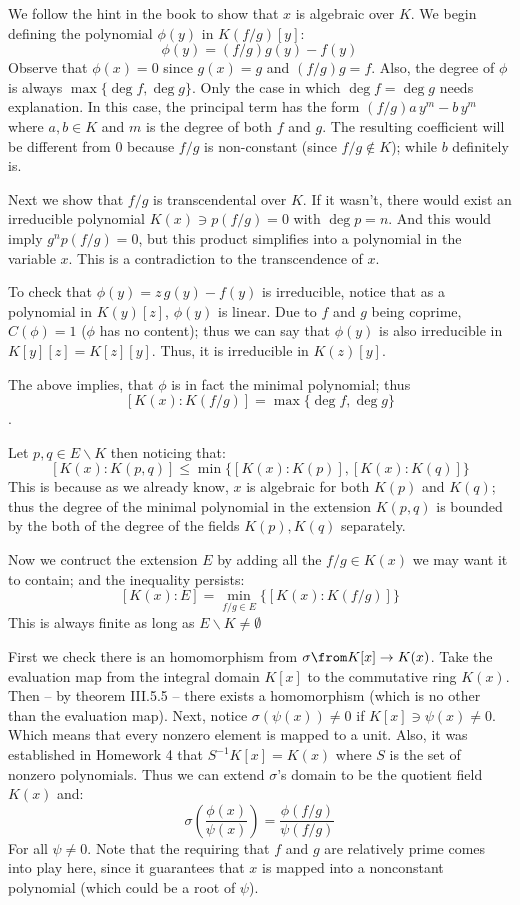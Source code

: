 We follow the hint in the book to show that $x$ is algebraic over $K$. 
We begin defining the polynomial $\phi(y)$ in $K(f/g)[y]$:
$$\phi(y) = (f/g)g(y) - f(y)$$
Observe that $\phi(x) =0$ since $g(x)=g$ and $(f/g)g=f$. 
Also, the degree of $\phi$ is always $\max\{ \deg f, \deg g\}$. 
Only the case in which $\deg f= \deg g$ needs explanation. 
In this case, the principal term has the form $(f/g) a\, y^m - b\, y^m$ where $a,b\in K$ and $m$ is the degree of both $f$ and $g$.
The resulting coefficient will be different from 0 because $f/g$ is non-constant (since $f/g\notin K$); while $b$ definitely is.

Next we show that $f/g$ is transcendental over $K$.
If it wasn't, there would exist an irreducible polynomial $K(x) \ni p(f/g)=0$ with $\deg p = n$.
And this would imply $g^np(f/g)=0$, but this product simplifies into a polynomial in the variable $x$.
This is a contradiction to the transcendence of $x$.

To check that $\phi(y)=z\,g(y)-f(y)$ is irreducible, notice that as a polynomial in $K(y)[z]$, $\phi(y)$ is linear. 
Due to $f$ and $g$ being coprime, $C(\phi)=1$ ($\phi$ has no content); thus we can say that  $\phi(y)$ is also irreducible in $K[y][z]=K[z][y]$.
Thus, it is irreducible in $K(z)[y]$.

The above implies, that $\phi$ is in fact the minimal polynomial; thus $$[K(x):K(f/g)]= \max\{ \deg f, \deg g\}$$.

Let $p,q\in E\backslash K$ then noticing that:
$$[K(x):K(p,q)] \leq \min\{ [K(x):K(p)], [K(x):K(q)]\}$$
This is because as we already know,  $x$ is algebraic for both $K(p)$ and $K(q)$; 
thus the degree of the minimal polynomial in the extension $K(p,q)$ is bounded by the both of the degree of the fields $K(p),K(q)$ separately.  

Now we contruct the extension $E$ by adding all the $f/g\in K(x)$ we may want it to contain; and the inequality persists:
$$[K(x):E] = \min_{f/g\in E} \{[K(x):K(f/g)]\}$$
This is always finite as long as $E\backslash K\neq \emptyset$

First we check there is an homomorphism from $\sigma \from K[x]\to K(x)$.
Take the evaluation map from the integral domain $K[x]$ to the commutative ring $K(x)$.
Then -- by theorem III.5.5 -- there exists a homomorphism (which is no other than the evaluation map).
Next, notice $\sigma(\psi(x))\neq 0$ if $K[x]\ni \psi(x) \neq 0$. Which means that every nonzero element is mapped to a unit.
Also, it was established in Homework 4 that $S^{-1}K[x] = K(x)$ where $S$ is the set of nonzero polynomials.
Thus we can extend $\sigma$'s domain to be the quotient field $K(x)$ and:
\begin{equation} \label{ecua.1}
\sigma\left(\frac{\phi(x)}{\psi(x)}\right) = \frac{\phi(f/g)}{\psi(f/g)}
\end{equation}
For all $\psi\neq 0$. 
Note that the requiring that $f$ and $g$ are relatively prime comes into play here, since it guarantees that $x$ is mapped into a nonconstant polynomial (which could be a root of $\psi$).

